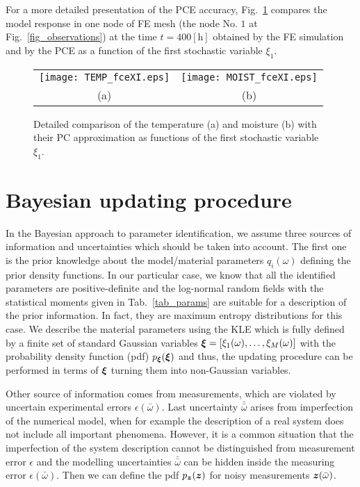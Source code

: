 \documentclass[preprint,12pt]{elsarticle}
\newcommand{\vek}[1]{\mathchoice{\displaystyle\boldsymbol#1}
{\textstyle\boldsymbol#1}{\scriptstyle\boldsymbol#1}
{\scriptscriptstyle\boldsymbol#1}}
\begin{document}
For a more detailed presentation of the PCE accuracy,
Fig.~\ref{fig_pceerr_detail} compares the model response in one node
of FE mesh (the node No. $1$ at Fig.~\ref{fig_observations}) at the
time $t = 400 [\mathrm{h}]$ obtained by the FE simulation and by the
PCE as a function of the first stochastic variable $\xi_1$.
\begin{figure} [ht!]
\centering
\begin{tabular}{cc}
\texttt{[image: TEMP\_fceXI.eps]}&
\texttt{[image: MOIST\_fceXI.eps]}\\
(a)&(b)
\end{tabular}
\caption{Detailed comparison of the temperature (a) and moisture (b)
  with their PC approximation as functions of the first stochastic variable
  $\xi_1$.}
\label{fig_pceerr_detail}
\end{figure}


\section{Bayesian updating procedure}
\label{sec:bayes}

In the Bayesian approach to parameter identification, we assume
three sources of information and uncertainties which should be
taken into account. The first one is the prior knowledge about the
model/material parameters $q_i(\omega)$ defining the prior density
functions. In our particular case, we know that all the identified
parameters are positive-definite and the log-normal random fields
with the statistical moments given in Tab.~\ref{tab_params} are
suitable for a description of the prior information. In fact, they
are maximum entropy distributions for this case. We describe the
material parameters using the KLE which is fully defined by a
finite set of standard Gaussian variables $\vek{\xi} =
[\xi_1(\omega), \dots, \xi_M(\omega)]$ with the probability
density function (pdf) $p_{\vek{\xi}}(\vek{\xi})$ and thus, the
updating procedure can be performed in terms of $\vek{\xi}$
turning them into non-Gaussian variables.

Other source of information comes from measurements, which are
violated by uncertain experimental errors
$\epsilon(\bar{\omega})$. Last uncertainty $\bar{\bar{\omega}}$
arises from imperfection of the numerical model, when for example
the description of a real system does not include all important
phenomena.  However, it is a common situation that the
imperfection of the system description cannot be distinguished
from measurement error $\epsilon$ and the modelling uncertainties
$\bar{\bar{\omega}}$ can be hidden inside the measuring error
$\epsilon(\bar{\omega})$. Then we can define the pdf
$p_{\vek{z}}(\vek{z})$ for noisy measurements
$\vek{z}(\bar{\omega})$.
\end{document}
